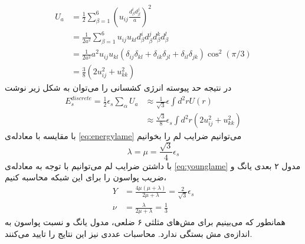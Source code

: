 \begin{equation}
\begin{aligned}
U_a&=\frac{1}{2}\sum_{\beta=1}^6(u_{ij}\frac{d_\beta^id_\beta^j}{a})^2\\
&=\frac{1}{2a^2}\sum_{\beta=1}^6u_{ij}u_{kl}d_\beta^id_\beta^jd_\beta^kd_\beta^l\\
&=\frac{1}{2a^2}a^2u_{ij}u_{kl}(\delta_{ij}\delta_{kl}+\delta_{ik}\delta_{jl}+\delta_{il}\delta_{jk})\cos^2(\pi/3)\\
&=\frac{3}{8}(2u_{ij}^2+u_{kk}^2)
\label{eq:gstrain1}
\end{aligned}
\end{equation}
در نتیجه‌ حد پیوسته انرژی کشسانی را می‌توان به شکل زیر نوشت
\begin{equation}
\begin{aligned}
E_s^{discrete}=\frac{1}{2}\epsilon_s\sum_\alpha U_a&\approx\frac{1}{\sqrt3}\epsilon\int d^2rU(r)\\
&\approx\frac{\sqrt3}{8}\epsilon_s\int d^2r(2u_{ij}^2+u_{kk}^2)
\end{aligned}
\end{equation}
با مقایسه با معادله‌ی 
\ref{eq:energylame}
می‌توانیم ضرایب لم را بخوانیم
\begin{equation}
\lambda=\mu=\frac{\sqrt3}{4}\epsilon_s
\end{equation}
با داشتن ضرایب لم می‌توانیم با توجه به معادله‌ی 
\ref{eq:younglame}
مدول ۲ بعدی یانگ و ضریب پواسون را برای این شبکه محاسبه کنیم،
\begin{equation}
\begin{aligned}
Y&=\frac{4\mu(\mu+\lambda)}{2\mu+\lambda}=\frac{2}{\sqrt3}\epsilon_s\\
\nu&=\frac{\lambda}{2\mu+\lambda}=\frac{1}{3}
\end{aligned}
\end{equation}
همانطور که می‌بینیم برای مش‌های مثلثی ۶ ضلعی، مدول یانگ و نسبت پواسون به اندازه‌ی مش بستگی ندارد. محاسبات عددی
\cite{springnetworkPRE2011}
نیز این نتایج را تایید می‌کنند.












